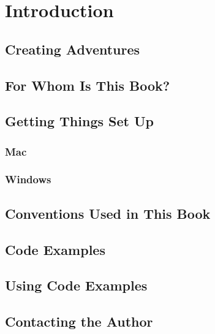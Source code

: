 

\chapter{Introduction} 

\section{Creating Adventures} 




\section{For Whom Is This Book?}


\section{Getting Things Set Up} 




\subsection{Mac} 

\subsection{Windows} 


\section{Conventions Used in This Book}


\section{Code Examples}

\section{Using Code Examples}

\section{Contacting the Author}

